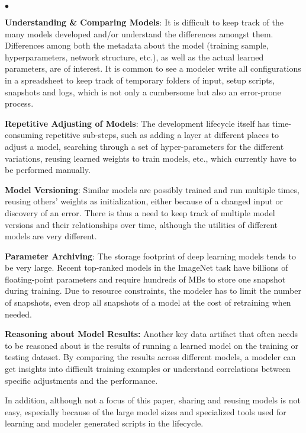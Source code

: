 \documentclass[conference]{IEEEtran}
\begin{document}
\begin{list}{$\bullet$}{\leftmargin 0.10in \topsep -2pt} %
       \item \textbf{Understanding \& Comparing Models}: It is difficult to keep track of the many models developed and/or understand the differences amongst them. Differences among both the metadata about the model (training sample, hyperparameters, network structure, etc.), as well as the actual learned parameters, are of interest. It is common to see a modeler write all configurations in a spreadsheet to keep track of temporary folders of input, setup scripts, snapshots and logs, which is not only a cumbersome but also an error-prone process. 
       \item \textbf{Repetitive Adjusting of Models}: The development lifecycle itself has time-consuming repetitive sub-steps, such as adding a layer at different places to adjust a model, searching through a set of hyper-parameters for the different variations, reusing learned weights to train models, etc., which currently have to be performed manually.
       \item \textbf{Model Versioning}: Similar models are possibly trained and run multiple times, reusing others' weights as initialization, either because of a changed input or discovery of an error. %
       There is thus a need to keep track of multiple model versions and their relationships over time, although the utilities of different models are very different. 
       \item \textbf{Parameter Archiving}: The storage footprint of deep learning models tends to be very large. Recent top-ranked models in the ImageNet task have billions of floating-point parameters and require hundreds of MBs to store one snapshot during training.
       Due to resource constraints, the modeler has to limit the number of snapshots, even drop all snapshots of a model at the cost of retraining when needed. 
      \item \textbf{Reasoning about Model Results:} Another key data artifact that often needs to be reasoned about is the results of running a learned model on the training or testing dataset. By comparing the results across different models, a modeler can get insights into difficult training examples or understand correlations between specific adjustments and the performance.
\end{list}
In addition, although not a focus of this paper, sharing and reusing models is not easy, especially because of the large model sizes and specialized tools used for learning and modeler generated scripts in the lifecycle.
\end{document}
